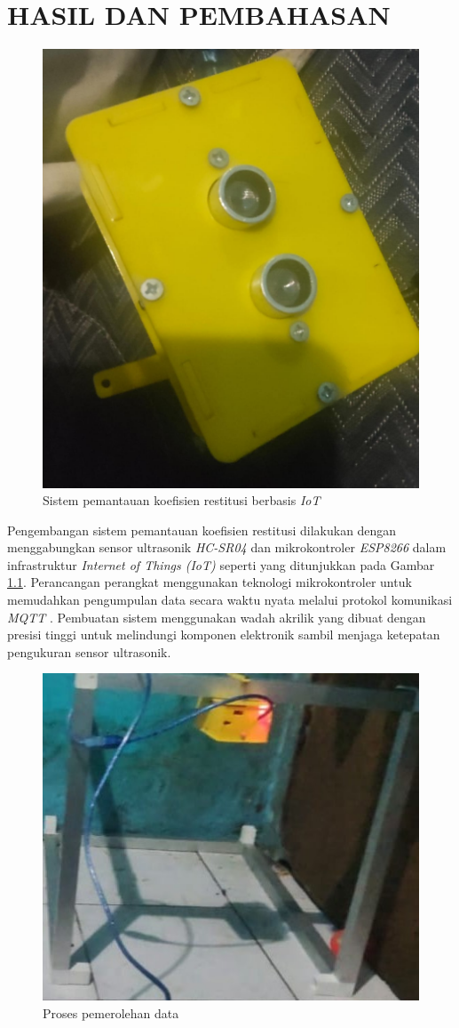 \chapter{HASIL DAN PEMBAHASAN}

\begin{figure}[!htbp]
    \centering
    \includegraphics[width=0.5\linewidth]{images/alat yang sudah selesai.jpg}
    \caption{Sistem pemantauan koefisien restitusi berbasis \textit{IoT}}
    \label{fig:pembahasan-1}
\end{figure}

Pengembangan sistem pemantauan koefisien restitusi dilakukan dengan menggabungkan sensor ultrasonik \textit{HC-SR04} dan mikrokontroler \textit{ESP8266} dalam infrastruktur \textit{Internet of Things (IoT)} seperti yang ditunjukkan pada Gambar \ref{fig:pembahasan-1}. Perancangan perangkat menggunakan teknologi mikrokontroler untuk memudahkan pengumpulan data secara waktu nyata melalui protokol komunikasi \textit{MQTT} \citep{kim2020mqtt}. Pembuatan sistem menggunakan wadah akrilik yang dibuat dengan presisi tinggi untuk melindungi komponen elektronik sambil menjaga ketepatan pengukuran sensor ultrasonik.

\begin{figure}[!htbp]
    \centering
    \includegraphics[width=0.5\linewidth]{images/akuisisi-data.jpeg}
    \caption{Proses pemerolehan data}
    \label{fig:pembahasan-2}
\end{figure}

